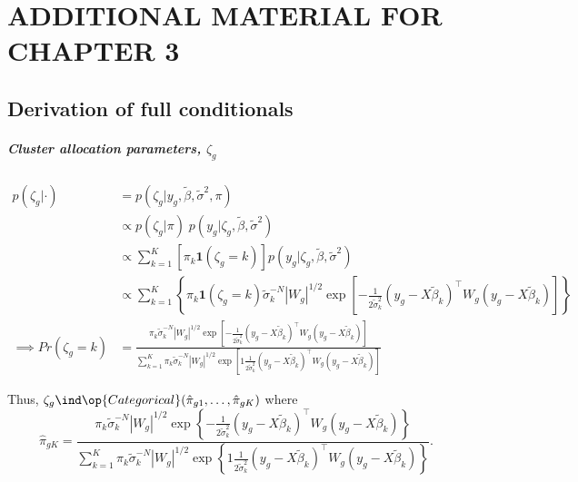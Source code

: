 \chapter{ADDITIONAL MATERIAL FOR CHAPTER 3}

\section*{Derivation of full conditionals}
\small
\paragraph{Cluster allocation parameters, $\zeta_g$}
\begin{align*}
p(\zeta_g|\cdot) & = p(\zeta_g|y_g, \tilde{\beta}, \tilde{\sigma}^2, \pi)\\
                 & \propto  p(\zeta_g|\pi)\; p(y_g|\zeta_g, \tilde{\beta}, \tilde{\sigma}^2)\\
                 & \propto  \sum_{k=1}^K \left[ \pi_k \bm{1}(\zeta_g=k)\right] p(y_g|\zeta_g,\tilde{\beta},\tilde{\sigma}^2)\\
                & \propto \sum_{k=1}^K \left\{ \pi_k \bm{1}(\zeta_g=k)  \tilde{\sigma}_k^{-N} |W_g|^{1/2} \exp \left[ -\frac{1}{2\tilde{\sigma}^2_k} \left( y_g - X\tilde{\beta}_k \right)^\top W_g \left( y_g - X\tilde{\beta}_k \right) \right]\right\}\\
\implies Pr(\zeta_g=k) & = \frac{\pi_k \tilde{\sigma}_k^{-N} |W_g|^{1/2} \exp \left[ -\frac{1}{2\tilde{\sigma}^2_k} \left( y_g - X\tilde{\beta}_k \right)^\top W_g \left( y_g - X\tilde{\beta}_k \right) \right]}{\sum_{k=1}^K \pi_k \tilde{\sigma}_k^{-N} |W_g|^{1/2} \exp \left[ 1\frac{1}{2\tilde{\sigma}^2_k} \left( y_g - X\tilde{\beta}_k \right)^\top W_g \left( y_g - X\tilde{\beta}_k \right) \right]}
\end{align*}

Thus, $\zeta_g \ind \op{Categorical}(\hat{\pi}_{g1},\ldots,\hat{\pi}_{gK})$ where
\begin{equation*}
\hat{\pi}_{gK} = \frac{\pi_k \tilde{\sigma}_k^{-N} |W_g|^{1/2} \exp \left\{ -\frac{1}{2\tilde{\sigma}^2_k} \left( y_g - X\tilde{\beta}_k \right)^\top W_g \left( y_g - X\tilde{\beta}_k \right) \right\}}{\sum_{k=1}^K \pi_k \tilde{\sigma}_k^{-N} |W_g|^{1/2} \exp \left\{ 1\frac{1}{2\tilde{\sigma}^2_k} \left( y_g - X\tilde{\beta}_k \right)^\top W_g \left( y_g - X\tilde{\beta}_k \right) \right\}}.
\end{equation*}

